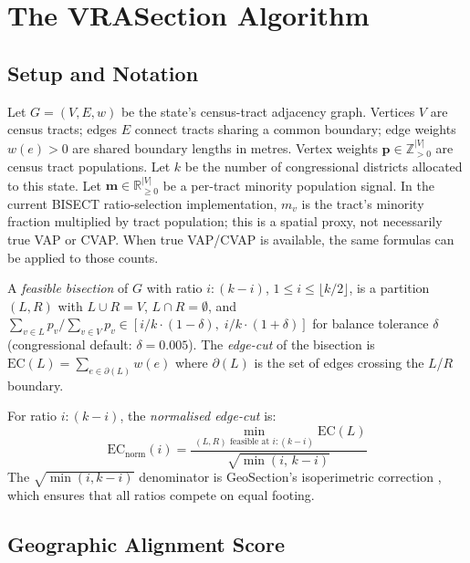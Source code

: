 \section{The VRASection Algorithm}
\label{sec:algorithm}

\subsection{Setup and Notation}

Let $G = (V, E, w)$ be the state's census-tract adjacency graph.
Vertices $V$ are census tracts; edges $E$ connect tracts sharing a common
boundary; edge weights $w(e) > 0$ are shared boundary lengths in metres.
Vertex weights $\mathbf{p} \in \mathbb{Z}_{>0}^{|V|}$ are census tract populations.
Let $k$ be the number of congressional districts allocated to this state.
Let $\mathbf{m} \in \mathbb{R}_{\geq 0}^{|V|}$ be a per-tract minority
population signal.  In the current BISECT ratio-selection implementation,
$m_v$ is the tract's minority fraction multiplied by tract population; this is
a spatial proxy, not necessarily true VAP or CVAP.  When true VAP/CVAP is
available, the same formulas can be applied to those counts.

\begin{definition}
A \emph{feasible bisection} of $G$ with ratio $i:(k-i)$, $1 \leq i \leq \lfloor k/2 \rfloor$,
is a partition $(L, R)$ with $L \cup R = V$, $L \cap R = \emptyset$,
and $\sum_{v \in L} p_v / \sum_{v \in V} p_v \in [i/k \cdot (1-\delta),\; i/k \cdot (1+\delta)]$
for balance tolerance $\delta$ (congressional default: $\delta = 0.005$).
The \emph{edge-cut} of the bisection is $\mathrm{EC}(L) = \sum_{e \in \partial(L)} w(e)$
where $\partial(L)$ is the set of edges crossing the $L$/$R$ boundary.
\end{definition}

\begin{definition}
For ratio $i:(k-i)$, the \emph{normalised edge-cut} is:
\[
  \mathrm{EC}_\text{norm}(i) = \frac{\min_{(L,R) \text{ feasible at } i:(k-i)} \mathrm{EC}(L)}{\sqrt{\min(i,\, k-i)}}
\]
The $\sqrt{\min(i,k-i)}$ denominator is GeoSection's isoperimetric correction
\citep{b8paper}, which ensures that all ratios compete on equal footing.
\end{definition}

\subsection{Geographic Alignment Score}

